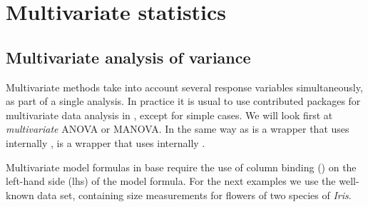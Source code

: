 \documentclass[krantz2]{krantz}\usepackage{knitr}
\begin{document}



\section{Multivariate statistics}\label{sec:stat:MV}

\subsection{Multivariate analysis of variance}
Multivariate methods take into account several response variables simultaneously, as part of a single analysis. In practice it is usual to use contributed packages for multivariate data analysis in \Rlang, except for simple cases. We will look first at \emph{multivariate} ANOVA or MANOVA. In the same way as  is a wrapper that uses internally ,  is a wrapper that uses internally .

Multivariate model formulas in base \Rlang require the use of column binding () on the left-hand side (lhs) of the model formula. For the next examples we use the well-known  data set, containing size measurements for flowers of two species of \emph{Iris}.
\end{document}
